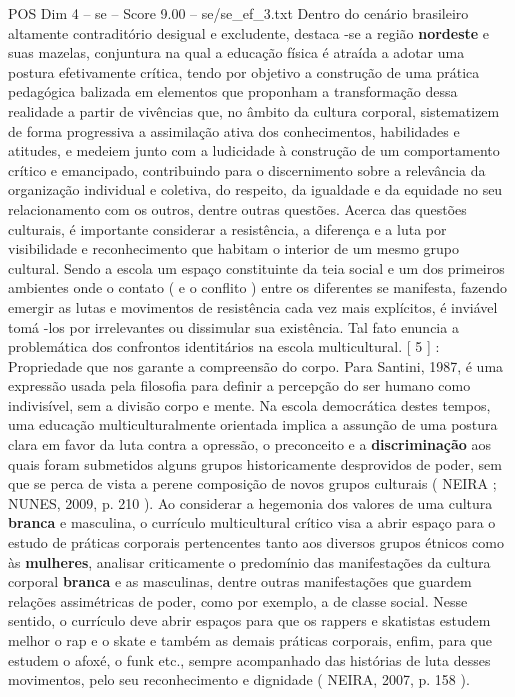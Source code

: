\begin{textsample}{POS Dim 4 – se – Score 9.00 – se/se\_ef\_3.txt}
Dentro do cenário brasileiro altamente contraditório desigual e excludente, destaca -se a região \textbf{nordeste} e suas mazelas, conjuntura na qual a educação física é atraída a adotar uma postura efetivamente crítica, tendo por objetivo a construção de uma prática pedagógica balizada em elementos que proponham a transformação dessa realidade a partir de vivências que, no âmbito da cultura corporal, sistematizem de forma progressiva a assimilação ativa dos conhecimentos, habilidades e atitudes, e medeiem junto com a ludicidade à construção de um comportamento crítico e emancipado, contribuindo para o discernimento sobre a relevância da organização individual e coletiva, do respeito, da igualdade e da equidade no seu relacionamento com os outros, dentre outras questões.
Acerca das questões culturais, é importante considerar a resistência, a diferença e a luta por visibilidade e reconhecimento que habitam o interior de um mesmo grupo cultural.
Sendo a escola um espaço constituinte da teia social e um dos primeiros ambientes onde o contato ( e o conflito ) entre os diferentes se manifesta, fazendo emergir as lutas e movimentos de resistência cada vez mais explícitos, é inviável tomá -los por irrelevantes ou dissimular sua existência.
Tal fato enuncia a problemática dos confrontos identitários na escola multicultural. [ 5 ] : Propriedade que nos garante a compreensão do corpo.
Para Santini, 1987, é uma expressão usada pela filosofia para definir a percepção do ser humano como indivisível, sem a divisão corpo e mente.
Na escola democrática destes tempos, uma educação multiculturalmente orientada implica a assunção de uma postura clara em favor da luta contra a opressão, o preconceito e a \textbf{discriminação} aos quais foram submetidos alguns grupos historicamente desprovidos de poder, sem que se perca de vista a perene composição de novos grupos culturais ( NEIRA ; NUNES, 2009, p. 210 ).
Ao considerar a hegemonia dos valores de uma cultura \textbf{branca} e masculina, o currículo multicultural crítico visa a abrir espaço para o estudo de práticas corporais pertencentes tanto aos diversos grupos étnicos como às \textbf{mulheres}, analisar criticamente o predomínio das manifestações da cultura corporal \textbf{branca} e as masculinas, dentre outras manifestações que guardem relações assimétricas de poder, como por exemplo, a de classe social.
Nesse sentido, o currículo deve abrir espaços para que os rappers e skatistas estudem melhor o rap e o skate e também as demais práticas corporais, enfim, para que estudem o afoxé, o funk etc., sempre acompanhado das histórias de luta desses movimentos, pelo seu reconhecimento e dignidade ( NEIRA, 2007, p. 158 ).

\end{textsample}
